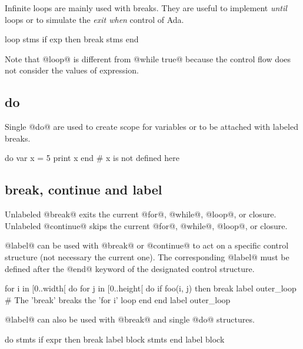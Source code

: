 Infinite loops are mainly used with breaks.
They are useful to implement \textit{until} loops or to simulate the \textit{exit when} control of Ada.

\begin{lst}
loop
	stms
	if exp then break
	stms
end
\end{lst}

Note that @loop@ is different from @while true@ because the control flow does not consider the values of expression.

\subsection{do}\label{do}

Single @do@ are used to create scope for variables or to be attached with labeled breaks.

\begin{lst}
do
	var x = 5
	print x
end
# x is not defined here
\end{lst}

\subsection{break, continue and label}\label{break}\label{continue}\label{label}

Unlabeled @break@ exits the current @for@, @while@, @loop@, or closure.
Unlabeled @continue@ skips the current @for@, @while@, @loop@, or closure.

@label@ can be used with @break@ or @continue@ to act on a specific control structure (not necessary the current one). 
The corresponding @label@ must be defined after the @end@ keyword of the designated control structure.

\begin{lst}
for i in [0..width[ do
	for j in [0..height[ do
		if foo(i, j) then break label outer_loop
		# The 'break' breaks the 'for i' loop
	end
end label outer_loop
\end{lst}

@label@ can also be used with @break@ and single @do@ structures.

\begin{lst}
do
	stmts
	if expr then break label block
	stmts
end label block
\end{lst}

